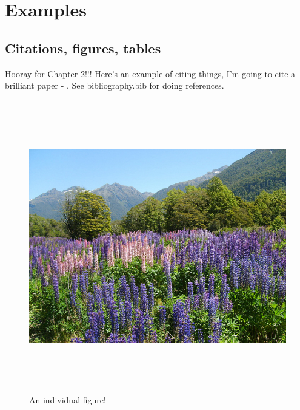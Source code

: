 \documentclass[../../main.tex]{subfiles}  %
\begin{document}
\section{Examples}

	\subsection{Citations, figures, tables}

	Hooray for Chapter 2!!! Here's an example of citing things, I'm going to cite a brilliant paper - \supercite{aartsSolutionDependencyUsing2014}. See bibliography.bib for doing references.

	\begin{figure}
		\includegraphics[height =5in]{./Plots/nature.jpg}
		\caption{An individual figure!}
	\end{figure}
			
\end{document}
